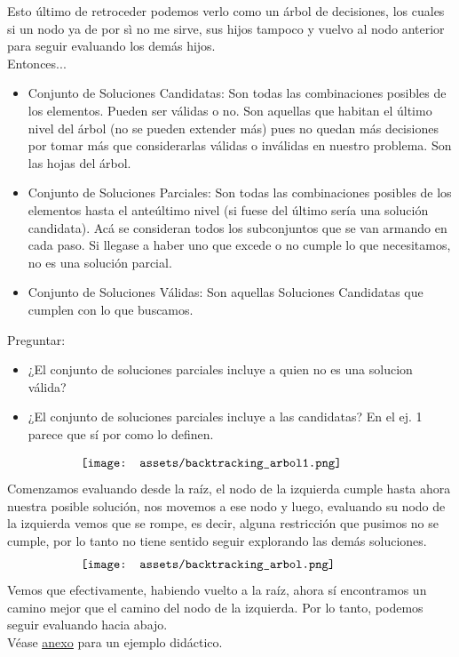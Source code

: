 \documentclass[10pt,a4paper]{article}
\begin{document}
Esto último de retroceder podemos verlo como un árbol de decisiones, los cuales si un nodo ya de por sì no me sirve, sus hijos tampoco y vuelvo al nodo anterior para seguir evaluando los demás hijos. \\
\newpage
Entonces...
\begin{itemize}
    \item Conjunto de Soluciones Candidatas: Son todas las combinaciones posibles de los elementos. Pueden ser válidas o no. Son aquellas que habitan el último nivel del árbol (no se pueden extender más) pues no quedan más decisiones por tomar más que considerarlas válidas o inválidas en nuestro problema. Son las hojas del árbol.
    \item Conjunto de Soluciones Parciales: Son todas las combinaciones posibles de los elementos hasta el anteúltimo nivel (si fuese del último sería una solución candidata). Acá se consideran todos los subconjuntos que se van armando en cada paso. Si llegase a haber uno que excede o no cumple lo que necesitamos, no es una solución parcial.
    \item Conjunto de Soluciones Válidas: Son aquellas Soluciones Candidatas que cumplen con lo que buscamos.
\end{itemize}
Preguntar: 
\begin{itemize}
    \item ¿El conjunto de soluciones parciales incluye a quien no es una solucion válida? 
    \item ¿El conjunto de soluciones parciales incluye a las candidatas? En el ej. 1 parece que sí por como lo definen.
\end{itemize}

\[\begin{minipage}[b]{0.7\textwidth}
    \texttt{[image: assets/backtracking\_arbol1.png]}
\end{minipage}\]
Comenzamos evaluando desde la raíz, el nodo de la izquierda cumple hasta ahora nuestra posible solución, nos movemos a ese nodo y luego, evaluando su nodo de la izquierda vemos que se rompe, es decir, alguna restricción que pusimos no se cumple, por lo tanto no tiene sentido seguir explorando las demás soluciones. 
\[\begin{minipage}[b]{0.7\textwidth}
    \texttt{[image: assets/backtracking\_arbol.png]}
\end{minipage}\]
Vemos que efectivamente, habiendo vuelto a la raíz, ahora sí encontramos un camino mejor que el camino del nodo de la izquierda. Por lo tanto, podemos seguir evaluando hacia abajo. \\
Véase \hyperref[subsec:backtracking_ex]{\underline{anexo}} para un ejemplo didáctico.
\end{document}
